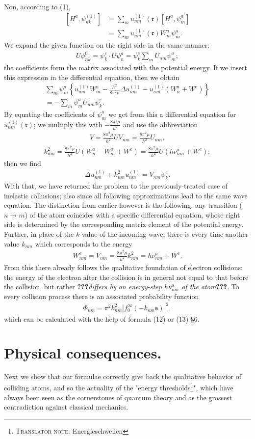 \documentclass[a4paper,11pt]{article}
\newcommand{\WTF}[1]{\textbf{???}\textit{#1}\textbf{???}}
\newcommand{\?}[2]{#1\footnote{\textsc{Translator note}: #2}}
\newcommand{\nequ}[2]{\begin{align*}\tag{#1}#2\end{align*}}
\newcommand{\uequ}[1]{\begin{align*}#1\end{align*}}
\begin{document}
Non, according to (1),
\uequ{
\left[ H^a, \psi_{nk}^{(1)}\right] 
&= \sum\limits_m u_{nm}^{(1)}(\mathfrak{r}) \left[H^a, \psi_m^a\right]\\
&= \sum\limits_m u_{nm}^{(1)}(\mathfrak{r}) W_m^a \psi_m^a.
}
We expand the given function on the right side in the same manner:
\uequ{
U\psi_{nk}^0 = \psi_k^e\cdot U\psi_n^a = \psi_k^e \sum\limits_m U_{nm}\psi_m^a;
}
the coefficients form the matrix associated with the potential energy. If we insert this expression in the differential equation, then we obtain
\uequ{
\sum\limits_m \psi_m^a\left\{u_{nm}^{(1)} W_m^a - \frac{h^2}{8\pi^2\mu}\Delta u_{nm}^{(1)} - u_{nm}^{(1)}(W_n^a + W^e)\right\} \\
 = -\sum\limits_m\psi_m^a U_{nm}\psi_k^e.
}
By equating the coefficients of $\psi_m^a$ we get from this a differential equation for $u_{nm}^{(1)}(\mathfrak{r})$; we multiply this with $-\frac{8\pi^s\mu}{h^2}$ and use the abbreviation
\nequ{6}{
V = \frac{8\pi^2\mu}{h^2}U
V_{nm} = \frac{8\pi^2\mu}{h^2}U_{nm},
}
\nequ{7}{
k_{nm}^2 = \frac{8\pi^2\mu}{h^2}U\left(W_n^a - W_m^a + W^e\right) = 
\frac{8\pi^2\mu}{h^2}U\left(h\nu_{nm}^a + W^e\right);
}
then we find
\nequ{8}{
	\Delta u_{nm}^{(1)} + k_{nm}^2 u_{nm}^{(1)} = V_{nm}\psi_k^e.
}
With that, we have returned the problem to the previously-treated case of inelastic collusions; also since all following approximations lead to the same wave equation. The distinction from earlier however is the following: any transition ($n \to m$) of the atom coincides with a specific differential equation, whose right side is determined by the corresponding matrix element of the potential energy. Further, in place of the $k$ value of the incoming wave, there is every time another value $k_{nm}$ which corresponds to the energy
\nequ{9}{
W_{nm}^e = V_{nm} = \frac{8\pi^2\mu}{h^2} k_{nm}^2 = h\nu_{nm}^a + W^e.
}
From this there already follows the qualitative foundation of electron collisions: the energy of the electron after the collision is in general not equal to that before the collision, but rather \WTF{differs by an energy-step $h\nu_{nm}^a$ of the atom}. To every collision process there is an associated probability function
\nequ{10}{
\Phi_{nm} = \pi^2 k^2_{nm}\left|f_0^\infty(-k_{nm}\mathfrak{s})\right|^2,
}
which can be calculated with the help of formula (12) or (13) \S6.

\section{Physical consequences.} Next we show that our formulae correctly give back the qualitative behavior of colliding atoms, and so the actuality of the "\?{energy thresholds}{Energieschwellen}", which have always been seen as the cornerstones of quantum theory and as the grossest contradiction against classical mechanics.
\end{document}
